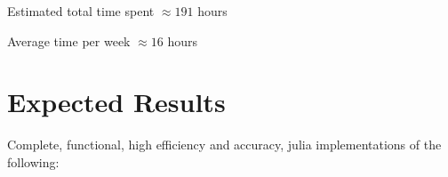 \documentclass{article}
\theoremstyle{mytheoremstyle}
\theoremstyle{mytheoremstyle}
\theoremstyle{myproblemstyle}
\begin{document}
      \vspace{5px}

      Estimated total time spent $\approx 191 $ hours 
      
      Average time per week $\approx 16 $ hours 
  
  \section*{Expected Results}\label{sec:Results} %
    Complete, functional, high efficiency and accuracy, julia implementations of the following:
  
    
\end{document}
